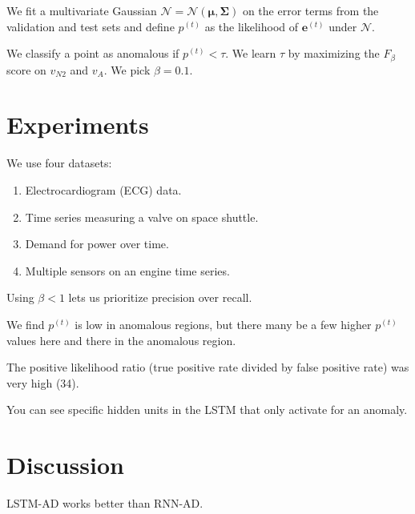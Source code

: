 \documentclass[a4paper]{article}
\begin{document}
We fit a multivariate Gaussian $\mathcal{N} = \mathcal{N}(\mathbf{\mu},
\mathbf{\Sigma})$ on the error terms from the validation and test sets and
define $p^{(t)}$ as the likelihood of $\mathbf{e}^{(t)}$ under $\mathcal{N}$.

We classify a point as anomalous if $p^{(t)} < \tau$. We learn $\tau$ by
maximizing the $F_{\beta}$ score on $v_{N2}$ and $v_A$. We pick $\beta = 0.1$.

\section{Experiments}
We use four datasets:

\begin{enumerate}
  \item Electrocardiogram (ECG) data.
  \item Time series measuring a valve on space shuttle.
  \item Demand for power over time.
  \item Multiple sensors on an engine time series.
\end{enumerate}

Using $\beta < 1$ lets us prioritize precision over recall.

We find $p^{(t)}$ is low in anomalous regions, but there many be a few higher
$p^{(t)}$ values here and there in the anomalous region.

The positive likelihood ratio (true positive rate divided by false positive
rate) was very high (34).

You can see specific hidden units in the LSTM that only activate for an anomaly.


\section{Discussion}
LSTM-AD works better than RNN-AD.
\end{document}
